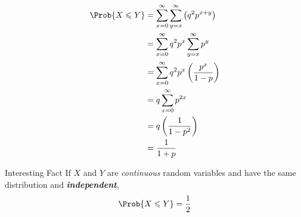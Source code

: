 \begin{Example}{}{}
\begin{enumerate}[label=(\roman*)]
              \begin{align*}
                  \Prob{X\leqslant Y}
                   & =
                  \sum\limits_{x=0}^{\infty}
                  \sum\limits_{y=x}^{\infty}\left( q^2 p^{x+y} \right) \\
                   & =\sum\limits_{x=0}^{\infty} q^2p^x
                  \sum\limits_{y=x}^{\infty} p^y                       \\
                   & =\sum\limits_{x=0}^{\infty}
                  q^2p^x\left( \frac{p^x}{1-p}  \right)                \\
                   & =q\sum\limits_{x=0}^{\infty} p^{2x}               \\
                   & =q\left( \frac{1}{1-p^2}  \right)                 \\
                   & =\frac{1}{1+p}
              \end{align*}

    \end{enumerate}
\end{Example}
\begin{Remark}{Interesting Fact}{}
    If $ X $ and $ Y $ are \emph{continuous} random variables
    and have the same distribution and \emph{\textbf{independent}},
    \[ \Prob{X\leqslant Y}=\frac{1}{2} \]
\end{Remark}
